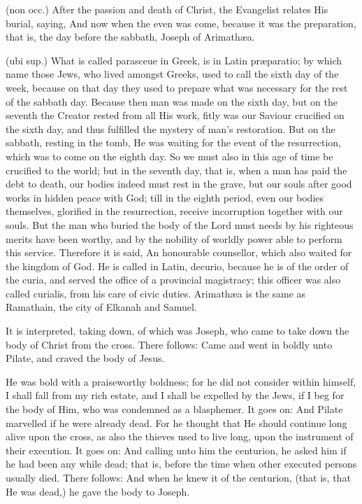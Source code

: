 (non occ.) After the passion and death of Christ, the Evangelist relates His burial, saying, And now when the even was come, because it was the preparation, that is, the day before the sabbath, Joseph of Arimathæa.

 (ubi sup.) What is called parasceue in Greek, is in Latin præparatio; by which name those Jews, who lived amongst Greeks, used to call the sixth day of the week, because on that day they used to prepare what was necessary for the rest of the sabbath day. Because then man was made on the sixth day, but on the seventh the Creator rested from all His work, fitly was our Saviour crucified on the sixth day, and thus fulfilled the mystery of man’s restoration. But on the sabbath, resting in the tomb, He was waiting for the event of the resurrection, which was to come on the eighth day. So we must also in this age of time be crucified to the world; but in the seventh day, that is, when a man has paid the debt to death, our bodies indeed must rest in the grave, but our souls after good works in hidden peace with God; till in the eighth period, even our bodies themselves, glorified in the resurrection, receive incorruption together with our souls. But the man who buried the body of the Lord must needs by his righteous merits have been worthy, and by the nobility of worldly power able to perform this service. Therefore it is said, An honourable counsellor, which also waited for the kingdom of God. He is called in Latin, decurio, because he is of the order of the curia, and served the office of a provincial magistracy; this officer was also called curialis, from his care of civic duties. Arimathæa is the same as Ramathain, the city of Elkanah and Samuel.

 It is interpreted, taking down, of which was Joseph, who came to take down the body of Christ from the cross. There follows: Came and went in boldly unto Pilate, and craved the body of Jesus.

 He was bold with a praiseworthy boldness; for he did not consider within himself, I shall fall from my rich estate, and I shall be expelled by the Jews, if I beg for the body of Him, who was condemned as a blasphemer. It goes on: And Pilate marvelled if he were already dead. For he thought that He should continue long alive upon the cross, as also the thieves used to live long, upon the instrument of their execution. It goes on: And calling unto him the centurion, he asked him if he had been any while dead; that is, before the time when other executed persons usually died. There follows: And when he knew it of the centurion, (that is, that He was dead,) he gave the body to Joseph.

